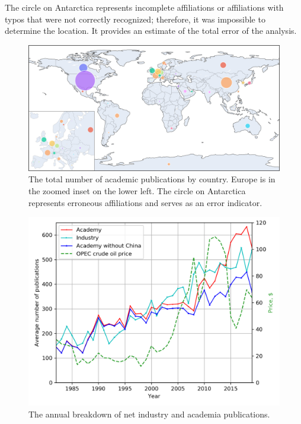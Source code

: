 \documentclass[energies,article,submit,moreauthors,pdftex]{Definitions/mdpi}
\begin{document}
The circle on Antarctica represents incomplete affiliations or affiliations with typos that were not correctly recognized; therefore, it was impossible to determine the location. It provides an estimate of the total error of the analysis.

\begin{figure}[ht!]
\centering
\includegraphics[width=\textwidth]{plottly_world3.png}
\caption{The total number of academic publications by country. Europe is in the zoomed inset on the lower left. The circle on Antarctica represents erroneous affiliations and serves as an error indicator.}
\label{acad_world}
\end{figure}

\begin{figure}[ht!]
\centering
\includegraphics[scale=0.7]{acad_indus_plot.png}
\caption{The annual breakdown of net industry and academia publications.}
\label{acad_vs_ind}
\end{figure}
\end{document}
